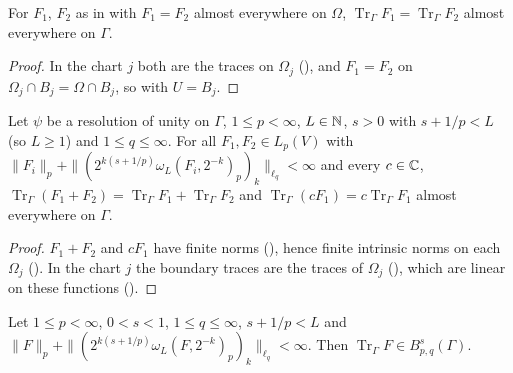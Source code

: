\begin{lemma}
\label{lem:boundary-trace-locality}
\leanok
{}
For $F_1$, $F_2$ as in  with $F_1 = F_2$ almost everywhere on
$\Omega$, $\operatorname{Tr}_\Gamma F_1 = \operatorname{Tr}_\Gamma F_2$ almost everywhere on $\Gamma$.
\end{lemma}

\begin{proof}
\leanok
In the chart $j$ both are the traces on $\Omega_j$ (), and
$F_1 = F_2$ on $\Omega_j \cap B_j = \Omega \cap B_j$, so  with $U = B_j$.
\end{proof}

\begin{lemma}
\label{lem:boundary-trace-linear}
\leanok
{}
Let $\psi$ be a resolution of unity on $\Gamma$, $1 \leq p < \infty$, $L \in \mathbb{N}$, $s > 0$ with
$s + 1/p < L$ (so $L \geq 1$) and $1 \leq q \leq \infty$. For all $F_1, F_2 \in L_p(V)$ with
$\|F_i\|_p + \|(2^{k(s + 1/p)} \omega_L(F_i, 2^{-k})_p)_k\|_{\ell_q} < \infty$ and every
$c \in \mathbb{C}$, $\operatorname{Tr}_\Gamma (F_1 + F_2) = \operatorname{Tr}_\Gamma F_1 +
\operatorname{Tr}_\Gamma F_2$ and $\operatorname{Tr}_\Gamma (c F_1) = c \operatorname{Tr}_\Gamma
F_1$ almost everywhere on $\Gamma$.
\end{lemma}

\begin{proof}
\leanok
$F_1 + F_2$ and $c F_1$ have finite norms (), hence finite intrinsic norms on
each $\Omega_j$ (). In the chart $j$ the boundary traces are the traces of
$\Omega_j$ (), which are linear on these functions
().
\end{proof}

\begin{theorem}
\label{thm:boundary-trace-bounded}
\leanok
{}
Let $1 \leq p < \infty$, $0 < s < 1$, $1 \leq q \leq \infty$, $s + 1/p < L$ and
$\|F\|_p + \|(2^{k(s + 1/p)} \omega_L(F, 2^{-k})_p)_k\|_{\ell_q} < \infty$. Then
$\operatorname{Tr}_\Gamma F \in B^s_{p,q}(\Gamma)$.
\end{theorem}

